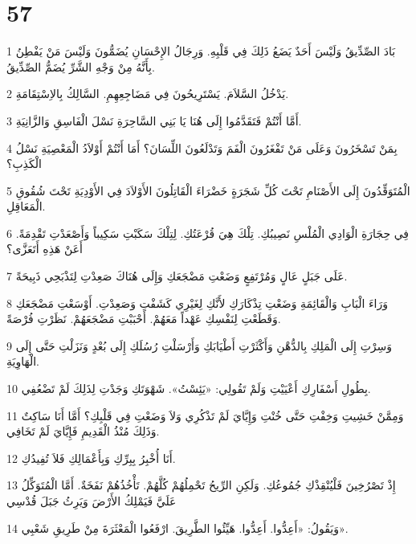 \chapter{57}

\par 1 بَادَ الصِّدِّيقُ وَلَيْسَ أَحَدٌ يَضَعُ ذَلِكَ فِي قَلْبِهِ. وَرِجَالُ الإِحْسَانِ يُضَمُّونَ وَلَيْسَ مَنْ يَفْطِنُ بِأَنَّهُ مِنْ وَجْهِ الشَّرِّ يُضَمُّ الصِّدِّيقُ.
\par 2 يَدْخُلُ السَّلاَمَ. يَسْتَرِيحُونَ فِي مَضَاجِعِهِمِ. السَّالِكُ بِالاِسْتِقَامَةِ.
\par 3 أَمَّا أَنْتُمْ فَتَقَدَّمُوا إِلَى هُنَا يَا بَنِي السَّاحِرَةِ نَسْلَ الْفَاسِقِ وَالزَّانِيَةِ.
\par 4 بِمَنْ تَسْخَرُونَ وَعَلَى مَنْ تَفْغَرُونَ الْفَمَ وَتَدْلَعُونَ اللِّسَانَ؟ أَمَا أَنْتُمْ أَوْلاَدُ الْمَعْصِيَةِ نَسْلُ الْكَذِبِ؟
\par 5 الْمُتَوَقِّدُونَ إِلَى الأَصْنَامِ تَحْتَ كُلِّ شَجَرَةٍ خَضْرَاءَ الْقَاتِلُونَ الأَوْلاَدَ فِي الأَوْدِيَةِ تَحْتَ شُقُوقِ الْمَعَاقِلِ.
\par 6 فِي حِجَارَةِ الْوَادِي الْمُلْسِ نَصِيبُكِ. تِلْكَ هِيَ قُرْعَتُكِ. لِتِلْكَ سَكَبْتِ سَكِيباً وَأَصْعَدْتِ تَقْدِمَةً. أَعَنْ هَذِهِ أَتَعَزَّى؟
\par 7 عَلَى جَبَلٍ عَالٍ وَمُرْتَفِعٍ وَضَعْتِ مَضْجَعَكِ وَإِلَى هُنَاكَ صَعِدْتِ لِتَذْبَحِي ذَبِيحَةً.
\par 8 وَرَاءَ الْبَابِ وَالْقَائِمَةِ وَضَعْتِ تِذْكَارَكِ لأَنَّكِ لِغَيْرِي كَشَفْتِ وَصَعِدْتِ. أَوْسَعْتِ مَضْجَعَكِ وَقَطَعْتِ لِنَفْسِكِ عَهْداً مَعَهُمْ. أَحْبَبْتِ مَضْجَعَهُمْ. نَظَرْتِ فُرْصَةً.
\par 9 وَسِرْتِ إِلَى الْمَلِكِ بِالدُّهْنِ وَأَكْثَرْتِ أَطْيَابَكِ وَأَرْسَلْتِ رُسُلَكِ إِلَى بُعْدٍ وَنَزَلْتِ حَتَّى إِلَى الْهَاوِيَةِ.
\par 10 بِطُولِ أَسْفَارِكِ أَعْيَيْتِ وَلَمْ تَقُولِي: «يَئِسْتُ». شَهْوَتَكِ وَجَدْتِ لِذَلِكَ لَمْ تَضْعُفِي.
\par 11 وَمِمَّنْ خَشِيتِ وَخِفْتِ حَتَّى خُنْتِ وَإِيَّايَ لَمْ تَذْكُرِي وَلاَ وَضَعْتِ فِي قَلْبِكِ؟ أَمَّا أَنَا سَاكِتٌ وَذَلِكَ مُنْذُ الْقَدِيمِ فَإِيَّايَ لَمْ تَخَافِي.
\par 12 أَنَا أُخْبِرُ بِبِرِّكِ وَبِأَعْمَالِكِ فَلاَ تُفِيدُكِ.
\par 13 إِذْ تَصْرُخِينَ فَلْيُنْقِذْكِ جُمُوعُكِ. وَلَكِنِ الرِّيحُ تَحْمِلُهُمْ كُلَّهُمْ. تَأْخُذُهُمْ نَفَخَةٌ. أَمَّا الْمُتَوَكِّلُ عَلَيَّ فَيَمْلِكُ الأَرْضَ وَيَرِثُ جَبَلَ قُدْسِي
\par 14 وَيَقُولُ: «أَعِدُّوا. أَعِدُّوا. هَيِّئُوا الطَّرِيقَ. ارْفَعُوا الْمَعْثَرَةَ مِنْ طَرِيقِ شَعْبِي».

